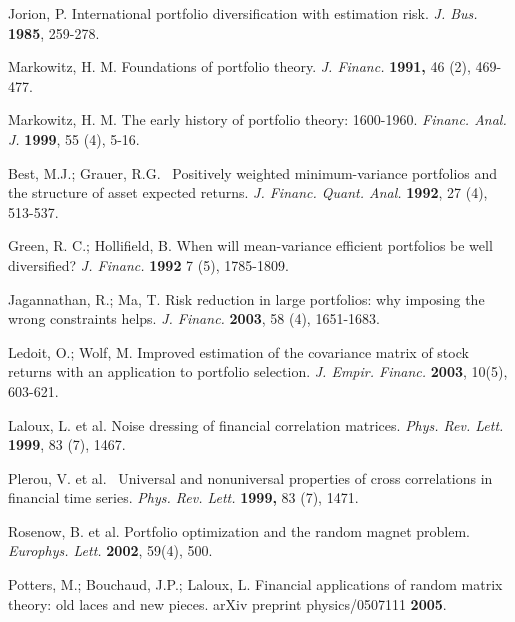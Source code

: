 \documentclass[journal,article,submit,moreauthors,pdftex]{Definitions/mdpi}
\begin{document}
%




\begin{thebibliography}{99}
	 Jorion, P. International portfolio diversification with
	estimation risk. \textit{J. Bus.} \textbf{1985}, 259-278.
	
	 Markowitz, H. M. Foundations of portfolio theory. \textit{J.
		Financ. }\textbf{1991, }46 (2), 469-477.
	
	 Markowitz, H. M. The early history of portfolio theory:
	1600-1960. \textit{Financ. Anal. J. }\textbf{1999}, 55 (4), 5-16.
	
	 Best, M.J.; Grauer, R.G. \ Positively weighted
	minimum-variance portfolios and the structure of asset expected returns. 
	\textit{J. Financ. Quant. Anal.}  \textbf{1992}, 27 (4), 513-537.
	
	 Green, R. C.; Hollifield, B. When will mean-variance
	efficient portfolios be well diversified? \textit{J. Financ. }\textbf{1992 }%
	7 (5), 1785-1809.
	
	 Jagannathan, R.; Ma, T. Risk reduction in large
	portfolios: why imposing the wrong constraints helps. \textit{J. Financ. }%
	\textbf{2003}, 58 (4), 1651-1683.
	
	 Ledoit, O.; Wolf, M.  Improved estimation of the covariance
	matrix of stock returns with an application to portfolio selection. \textit{%
		J. Empir. Financ. }\textbf{2003}, 10(5), 603-621.
	
	 Laloux, L. et al. Noise dressing of financial correlation
	matrices. \textit{Phys. Rev. Lett. }\textbf{1999}, 83 (7), 1467.
	
	 Plerou, V. et al. \ Universal and nonuniversal properties
	of cross correlations in financial time series. \textit{Phys. Rev. Lett. }%
	\textbf{1999, }83 (7), 1471.
	
	 Rosenow, B. et al. Portfolio optimization and the random
	magnet problem. \textit{Europhys. Lett. }\textbf{2002}, 59(4), 500.
	
	 Potters, M.; Bouchaud, J.P.; Laloux, L.  Financial
	applications of random matrix theory: old laces and new pieces. arXiv
	preprint physics/0507111 \textbf{2005}.
	

\end{thebibliography}
\end{document}
